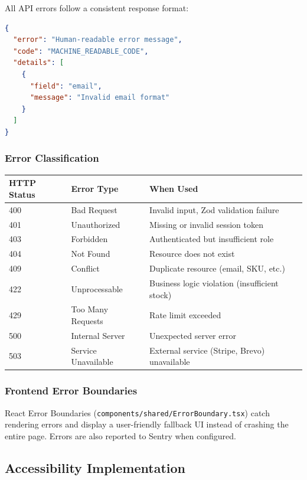 \documentclass[12pt,onecolumn]{IEEEtran}
\begin{document}
All API errors follow a consistent response format:

\begin{lstlisting}[language=JSON,caption={Standard error response format}]
{
  "error": "Human-readable error message",
  "code": "MACHINE_READABLE_CODE",
  "details": [
    {
      "field": "email",
      "message": "Invalid email format"
    }
  ]
}
\end{lstlisting}

\subsubsection{Error Classification}

\begin{center}
\begin{tabularx}{\textwidth}{llX}
  \toprule
  \textbf{HTTP Status} & \textbf{Error Type} & \textbf{When Used} \\
  \midrule
  400 & Bad Request       & Invalid input, Zod validation failure \\
  401 & Unauthorized      & Missing or invalid session token \\
  403 & Forbidden         & Authenticated but insufficient role \\
  404 & Not Found         & Resource does not exist \\
  409 & Conflict          & Duplicate resource (email, SKU, etc.) \\
  422 & Unprocessable     & Business logic violation (insufficient stock) \\
  429 & Too Many Requests & Rate limit exceeded \\
  500 & Internal Server   & Unexpected server error \\
  503 & Service Unavailable & External service (Stripe, Brevo) unavailable \\
  \bottomrule
\end{tabularx}
\end{center}

\subsubsection{Frontend Error Boundaries}

React Error Boundaries (\texttt{components/shared/ErrorBoundary.tsx}) catch rendering errors and display a user-friendly fallback UI instead of crashing the entire page. Errors are also reported to Sentry when configured.

\subsection{Accessibility Implementation}
\end{document}

